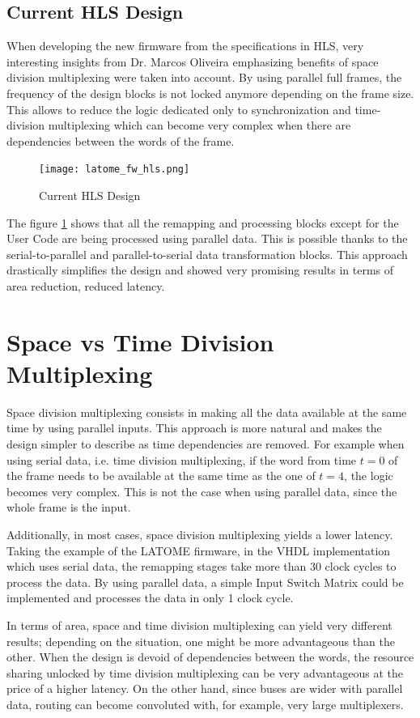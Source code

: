 \subsection{Current HLS Design}\label{sec:current-hls-design}
When developing the new firmware from the specifications in HLS, very interesting insights from Dr. Marcos Oliveira emphasizing benefits of space division multiplexing were taken into account. By using parallel full frames, the frequency of the design blocks is not locked anymore depending on the frame size. This allows to reduce the logic dedicated only to synchronization and time-division multiplexing which can become very complex when there are dependencies between the words of the frame.

\begin{figure}
    \centering
    \texttt{[image: latome\_fw\_hls.png]}
    \caption{Current HLS Design}
    \label{fig:current-HLS-design}
\end{figure}

The figure \ref{fig:current-HLS-design} shows that all the remapping and processing blocks except for the User Code are being processed using parallel data. This is possible thanks to the serial-to-parallel and parallel-to-serial data transformation blocks. This approach drastically simplifies the design and showed very promising results in terms of area reduction, reduced latency.

\section{Space vs Time Division Multiplexing}\label{sec:space-versus-time-division-multiplexing}
Space division multiplexing consists in making all the data available at the same time by using parallel inputs. This approach is more natural and makes the design simpler to describe as time dependencies are removed. For example when using serial data, i.e. time division multiplexing, if the word from time \(t=0\) of the frame needs to be available at the same time as the one of \(t=4\), the logic becomes very complex. This is not the case when using parallel data, since the whole frame is the input.

Additionally, in most cases, space division multiplexing yields a lower latency. Taking the example of the LATOME firmware, in the VHDL implementation which uses serial data, the remapping stages take more than 30 clock cycles to process the data. By using parallel data, a simple Input Switch Matrix could be implemented and processes the data in only 1 clock cycle.

In terms of area, space and time division multiplexing can yield very different results; depending on the situation, one might be more advantageous than the other. When the design is devoid of dependencies between the words, the resource sharing unlocked by time division multiplexing can be very advantageous at the price of a higher latency. On the other hand, since buses are wider with parallel data, routing can become convoluted with, for example, very large multiplexers.